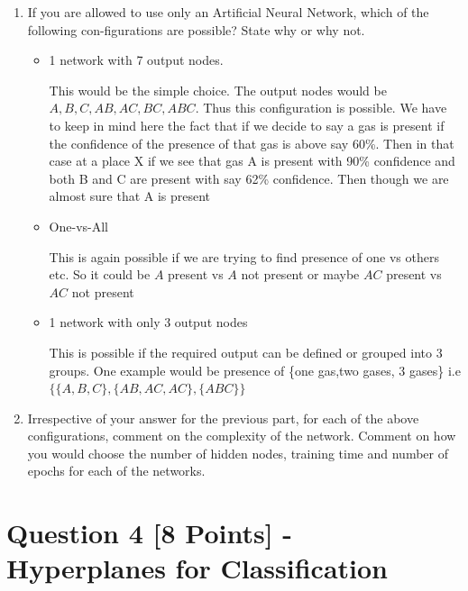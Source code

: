 \documentclass[fontsize=10pt,DIV=14]{scrartcl}
\begin{document}
	\begin{enumerate}
		\item
		If you are allowed to use only an Artiﬁcial Neural Network, which of the following con-ﬁgurations are possible? State why or why not.
		\begin{itemize}
			\item
			1 network with 7 output nodes.

			This would be the simple choice. The output nodes would be $A, B, C, AB, AC, BC, ABC$. Thus this configuration is possible. We have to keep in mind here the fact that if we decide to say a gas is present if the confidence of the presence of that gas is above say 60\%. Then in that case at a place X if we see that gas A is present with 90\% confidence and both B and C are present with say 62\% confidence. Then though we are almost sure that A is present 

			\item
			One-vs-All

			This is again possible if we are trying to find presence of one vs others etc. So it could be $A$ present vs $A$ not present or maybe $AC$ present vs $AC$ not present

			\item
			1 network with only 3 output nodes

			This is possible if the required output can be defined or grouped into 3 groups. One example would be presence of \{one gas,two gases, 3 gases\} i.e $\{\{A,B,C\},\{AB,AC,AC\},\{ABC\}\}$
		\end{itemize}

		\item
		Irrespective of your answer for the previous part, for each of the above conﬁgurations, comment on the complexity of the network. Comment on how you would choose the number of hidden nodes, training time and number of epochs for each of the networks.

	\end{enumerate}

	\section{Question 4 [8 Points] - Hyperplanes for Classification}
\end{document}
